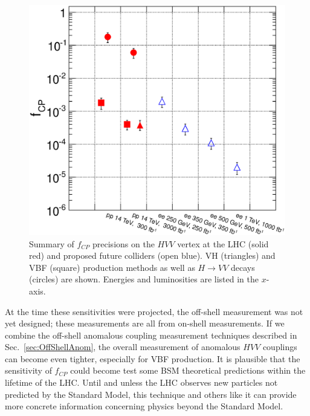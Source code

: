 \begin{figure}[htbp]
\begin{center}
\includegraphics[width=.9\linewidth]{Conclusions/figures/summary_fcp}
\caption[Summary of Precisions for CP-Violating Anomalous Coupling in $HVV$ Vertex at LHC and Future Colliders]{Summary of $f_{CP}$ precisions on the $HVV$ vertex at the LHC (solid red) and proposed future colliders (open blue). VH (triangles) and VBF (square) production methods as well as $H\rightarrow VV$ decays (circles) are shown. Energies and luminosities are listed in the $x$-axis.}
\label{fig:SnowmassCP}
\end{center}
\end{figure}

At the time these sensitivities were projected, the off-shell measurement was not yet designed; these measurements are all from on-shell measurements. If we combine the off-shell anomalous coupling measurement techniques described in Sec.~\ref{sec:OffShellAnom}, the overall measurement of anomalous $HVV$ couplings can become even tighter, especially for VBF production. It is plausible that the sensitivity of $f_{CP}$ could become test some BSM theoretical predictions within the lifetime of the LHC. Until and unless the LHC observes new particles not predicted by the Standard Model, this technique and others like it can provide more concrete information concerning physics beyond the Standard Model.

